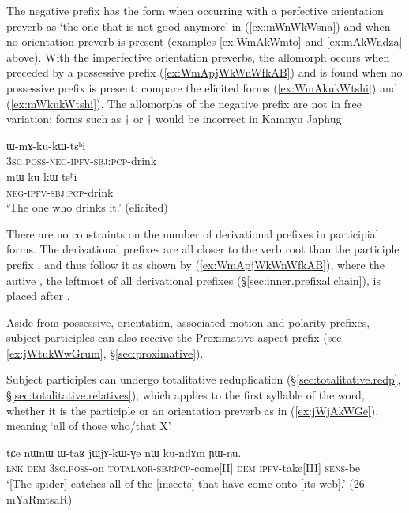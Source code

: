 The negative prefix has the form  when occurring with a perfective orientation preverb as  `the one that is not good anymore' in (\ref{ex:mWnWkWsna}) and  when no orientation preverb is present (examples \ref{ex:WmAkWmto} and \ref{ex:mAkWndza} above). With the imperfective orientation preverbs, the allomorph  occurs when preceded by a possessive prefix (\ref{ex:WmApjWkWnWfkAB}) and  is found when no possessive prefix is present: compare the elicited forms (\ref{ex:WmAkukWtshi}) and (\ref{ex:mWkukWtshi}). The allomorphs of the negative prefix are not in free variation: forms such as $\dagger$ or $\dagger$ would be incorrect in Kamnyu Japhug.

 \begin{exe} 
\ex \label{ex:WmAkukWtshi}
\gll ɯ-mɤ-ku-kɯ-tsʰi \\
\textsc{3sg}.\textsc{poss}-\textsc{neg}-\textsc{ipfv}-\textsc{sbj}:\textsc{pcp}-drink \\
\ex \label{ex:mWkukWtshi}
\gll mɯ-ku-kɯ-tsʰi \\
\textsc{neg}-\textsc{ipfv}-\textsc{sbj}:\textsc{pcp}-drink \\
\glt  `The one who drinks it.' (elicited)
\end{exe}

There are no constraints on the number of derivational prefixes in participial forms. The derivational prefixes are all closer to the verb root than the participle prefix , and thus follow it as shown by (\ref{ex:WmApjWkWnWfkAB}), where the autive , the leftmost of all derivational prefixes (§\ref{sec:inner.prefixal.chain}), is placed after . 

Aside from possessive, orientation, associated motion and polarity prefixes, subject participles can also receive the Proximative aspect prefix   (see \ref{ex:jWtukWwGrum}, §\ref{sec:proximative}).
 
Subject participles can undergo totalitative reduplication (§\ref{sec:totalitative.redp}, §\ref{sec:totalitative.relatives}), which applies to the first syllable of the word, whether it is the participle  or an orientation preverb as in (\ref{ex:jWjAkWGe}), meaning `all of those who/that X'.

\begin{exe}
\ex \label{ex:jWjAkWGe}
\gll tɕe nɯnɯ ɯ-taʁ jɯ\redp{}jɤ-kɯ-ɣe nɯ ku-ndɤm ɲɯ-ŋu. \\
\textsc{lnk} \textsc{dem} \textsc{3sg}.\textsc{poss}-on \textsc{total}\redp{}\textsc{aor}-\textsc{sbj}:\textsc{pcp}-come[II] \textsc{dem} \textsc{ipfv}-take[III] \textsc{sens}-be \\
\glt `[The spider] catches all of the [insects] that have come onto [its web].' (26-mYaRmtsaR) 
\end{exe}

